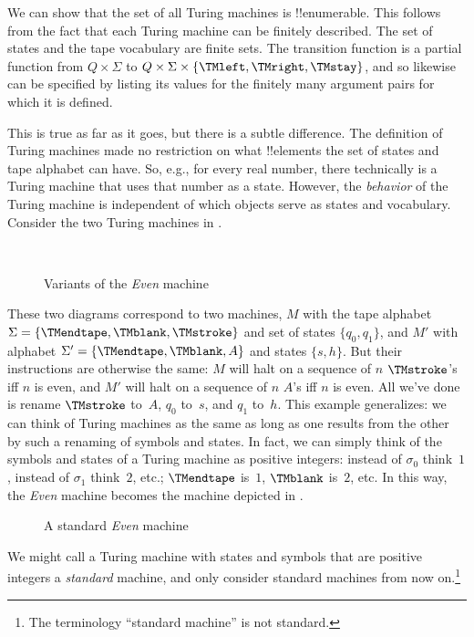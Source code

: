 \documentclass[../../../include/open-logic-section]{subfiles}
\begin{document}

\begin{explain}
We can show that the set of all Turing machines is !!{enumerable}.
This follows from the fact that each Turing machine can be finitely
described.  The set of states and the tape vocabulary are finite sets.
The transition function is a partial function from $Q \times \Sigma$
to $Q \times \Sigma \times \{\TMleft, \TMright, \TMstay\}$, and so
likewise can be specified by listing its values for the finitely many
argument pairs for which it is defined.

This is true as far as it goes, but there is a subtle difference. The
definition of Turing machines made no restriction on what !!{element}s
the set of states and tape alphabet can have. So, e.g., for every real
number, there technically is a Turing machine that uses that number as
a state. However, the \emph{behavior} of the Turing machine is
independent of which objects serve as states and vocabulary. Consider
the two Turing machines in .
\begin{figure}
\centering
{}\\
\caption{Variants of the \emph{Even} machine}
\end{figure}
These two diagrams correspond to two machines, $M$ with the tape
alphabet $\Sigma = \{\TMendtape,\TMblank,\TMstroke\}$ and set of
states $\{q_0,q_1\}$, and $M'$ with alphabet $\Sigma' =
\{\TMendtape,\TMblank,A\}$ and states $\{s,h\}$. But their
instructions are otherwise the same: $M$ will halt on a sequence of
$n$ $\TMstroke$'s iff $n$ is even, and $M'$ will halt on a sequence of
$n$ $A$'s iff $n$ is even. All we've done is rename $\TMstroke$
to~$A$, $q_0$ to~$s$, and $q_1$ to~$h$. This example generalizes: we
can think of Turing machines as the same as long as one results from
the other by such a renaming of symbols and states.  In fact, we can
simply think of the symbols and states of a Turing machine as positive
integers: instead of $\sigma_0$ think~$1$, instead of $\sigma_1$
think~$2$, etc.; $\TMendtape$ is~$1$, $\TMblank$ is~$2$, etc. In this
way, the \emph{Even} machine becomes the machine depicted in
.
\begin{figure}
\centering
{}
\caption{A standard \emph{Even} machine}
\end{figure}
We might call a Turing machine with states and symbols that are
positive integers a \emph{standard} machine, and only consider
standard machines from now on.\footnote{The terminology ``standard
machine'' is not standard.}


\end{explain}
\end{document}
